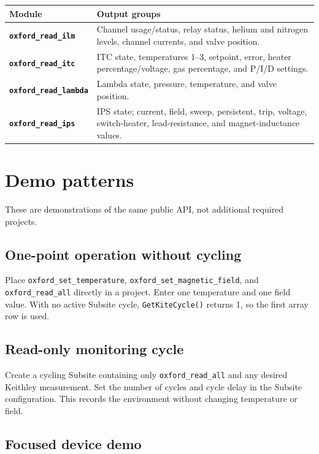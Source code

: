 \documentclass[10pt,a4paper]{article}
\newcommand{\api}[1]{\nolinkurl{#1}}
\newcommand{\module}[1]{\textcolor{OxfordBlue}{\textbf{\api{#1}}}}
\begin{document}
\begin{longtable}{@{}>{\raggedright\arraybackslash}p{}
                        >{\raggedright\arraybackslash}p{}@{}}
\toprule
\textbf{Module} & \textbf{Output groups} \\
\midrule
\endhead
\module{oxford_read_ilm} &
Channel usage/status, relay status, helium and nitrogen levels, channel
currents, and valve position. \\
\addlinespace
\module{oxford_read_itc} &
ITC state, temperatures 1--3, setpoint, error, heater percentage/voltage,
gas percentage, and P/I/D settings. \\
\addlinespace
\module{oxford_read_lambda} &
Lambda state, pressure, temperature, and valve position. \\
\addlinespace
\module{oxford_read_ips} &
IPS state; current, field, sweep, persistent, trip, voltage, switch-heater,
lead-resistance, and magnet-inductance values. \\
\bottomrule
\end{longtable}

\section{Demo patterns}

These are demonstrations of the same public API, not additional required
projects.

\subsection{One-point operation without cycling}

Place \api{oxford_set_temperature}, \api{oxford_set_magnetic_field}, and
\api{oxford_read_all} directly in a project. Enter one temperature and one
field value. With no active Subsite cycle, \api{GetKiteCycle()} returns 1, so
the first array row is used.

\subsection{Read-only monitoring cycle}

Create a cycling Subsite containing only \api{oxford_read_all} and any desired
Keithley measurement. Set the number of cycles and cycle delay in the Subsite
configuration. This records the environment without changing temperature or
field.

\subsection{Focused device demo}
\end{document}
